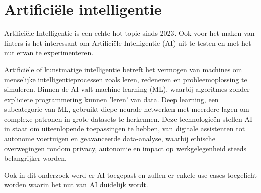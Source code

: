\section{Artificiële intelligentie}
Artificiële Intelligentie is een echte hot-topic sinds 2023. Ook voor het maken van linters is het interessant om Artificiële Intelligentie (AI) uit te testen en met het nut ervan te experimenteren.

Artificiële of kunstmatige intelligentie betreft het vermogen van machines om menselijke intelligentieprocessen zoals leren, redeneren en probleemoplossing te simuleren. Binnen de AI valt machine learning (ML), waarbij algoritmes zonder expliciete programmering kunnen 'leren' van data. Deep learning, een subcategorie van ML, gebruikt diepe neurale netwerken met meerdere lagen om complexe patronen in grote datasets te herkennen. Deze technologieën stellen AI in staat om uiteenlopende toepassingen te hebben, van digitale assistenten tot autonome voertuigen en geavanceerde data-analyse, waarbij ethische overwegingen rondom privacy, autonomie en impact op werkgelegenheid steeds belangrijker worden. \autocite{IBM2023}

Ook in dit onderzoek werd er AI toegepast en zullen er enkele use cases toegelicht worden waarin het nut van AI duidelijk wordt.